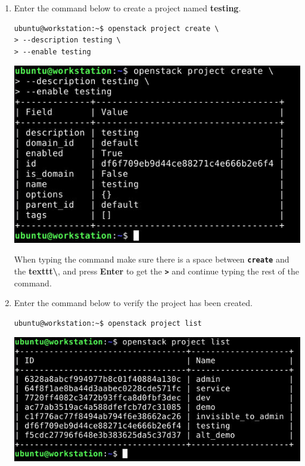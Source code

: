 \documentclass[letterpaper, 12pt]{article}
\begin{document}
\begin{enumerate}
    \item Enter the command below to create a project named \textbf{testing}.
\begin{lstlisting}
ubuntu@workstation:~$ openstack project create \
> --description testing \
> --enable testing
\end{lstlisting}

    \begin{center}
        \includegraphics[width=\linewidth]{images/part2/step4.png}
    \end{center}

    \begin{tipbox}{}
        When typing the command make sure there is a space between \textbf{\texttt{create}} and the
        \textbf{texttt{\textbackslash}}, and press \textbf{Enter} to get the \textbf{\texttt{>}} and continue typing the
        rest of the command.
    \end{tipbox}

    \item Enter the command below to verify the project has been created.
\begin{lstlisting}
ubuntu@workstation:~$ openstack project list
\end{lstlisting}

    \begin{center}
        \includegraphics[width=\linewidth]{images/part2/step5.png}
    \end{center}


\end{enumerate}
\end{document}
